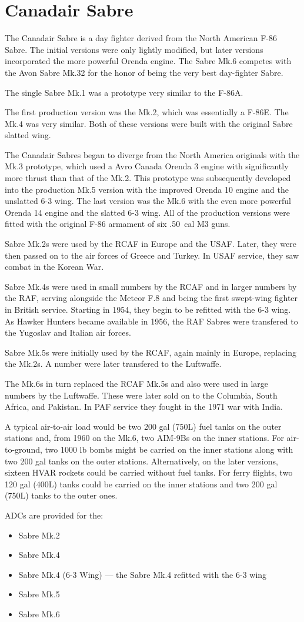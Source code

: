 \section*{Canadair Sabre}

The Canadair Sabre is a day fighter derived from the North American F-86 Sabre. The initial versions were only lightly modified, but later versions incorporated the more powerful Orenda engine. The Sabre Mk.6 competes with the Avon Sabre Mk.32  for the honor of being the very best day-fighter Sabre.

The single Sabre Mk.1 was a prototype very similar to the F-86A. 

The first production version was the Mk.2, which was essentially a F-86E. The Mk.4 was very similar. Both of these versions were built with the original Sabre slatted wing.

The Canadair Sabres began to diverge from the North America originals with the Mk.3 prototype, which used a Avro Canada Orenda 3 engine with significantly more thrust than that of the Mk.2. This prototype was subsequently developed into the production Mk.5 version with the improved Orenda 10 engine and the unslatted 6-3 wing. The last version was the Mk.6 with the even more powerful Orenda 14 engine and the slatted 6-3 wing. All of the production versions were fitted with the original F-86 armament of six .50~cal M3 guns.

Sabre Mk.2s were used by the RCAF in Europe and the USAF. Later, they were then passed on to the air forces of Greece and Turkey. In USAF service, they saw combat in the Korean War.

Sabre Mk.4s were used in small numbers by the RCAF and in larger numbers by the RAF, serving alongside the Meteor F.8 and being the first swept-wing fighter in British service. Starting in 1954, they begin to be refitted with the 6-3 wing. As Hawker Hunters became available in 1956, the RAF Sabres were transfered to the Yugoslav and Italian air forces.

Sabre Mk.5s were initially used by the RCAF, again mainly in Europe, replacing the Mk.2s. A number were later transfered to the Luftwaffe.

The Mk.6s in turn replaced the RCAF Mk.5s and also were used in large numbers by the Luftwaffe. These were later sold on to the Columbia, South Africa, and Pakistan. In PAF service they fought in the 1971 war with India.

A typical air-to-air load would be two 200 gal (750L) fuel tanks on the outer stations and, from 1960 on the Mk.6, two AIM-9Bs on the inner stations. For air-to-ground, two 1000 lb bombs might be carried on the inner stations along with two 200 gal tanks on the outer stations. Alternatively, on the later versions, sixteen HVAR rockets could be carried without fuel tanks. For ferry flights, two 120 gal (400L) tanks could be carried on the inner stations and two 200 gal (750L) tanks to the outer ones.

ADCs are provided for the:
\begin{itemize}
\item Sabre Mk.2
\item Sabre Mk.4
\item Sabre Mk.4 (6-3 Wing) --- the Sabre Mk.4 refitted with the 6-3 wing
\item Sabre Mk.5
\item Sabre Mk.6
\end{itemize}
